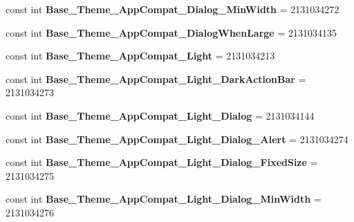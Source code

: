 \begin{DoxyCompactItemize}
\item 
\hypertarget{classClient_1_1Droid_1_1Resource_1_1Style_ab2fabf965afd5b155819f84733641431}{}const int {\bfseries Base\+\_\+\+Theme\+\_\+\+App\+Compat\+\_\+\+Dialog\+\_\+\+Min\+Width} = 2131034272\label{classClient_1_1Droid_1_1Resource_1_1Style_ab2fabf965afd5b155819f84733641431}

\item 
\hypertarget{classClient_1_1Droid_1_1Resource_1_1Style_a732d53e459b30f355b0a9300afff2002}{}const int {\bfseries Base\+\_\+\+Theme\+\_\+\+App\+Compat\+\_\+\+Dialog\+When\+Large} = 2131034135\label{classClient_1_1Droid_1_1Resource_1_1Style_a732d53e459b30f355b0a9300afff2002}

\item 
\hypertarget{classClient_1_1Droid_1_1Resource_1_1Style_a81e9e79abb9a4833d9c52c37330cea3b}{}const int {\bfseries Base\+\_\+\+Theme\+\_\+\+App\+Compat\+\_\+\+Light} = 2131034213\label{classClient_1_1Droid_1_1Resource_1_1Style_a81e9e79abb9a4833d9c52c37330cea3b}

\item 
\hypertarget{classClient_1_1Droid_1_1Resource_1_1Style_a26b4f1395913234b28d596fc8235762a}{}const int {\bfseries Base\+\_\+\+Theme\+\_\+\+App\+Compat\+\_\+\+Light\+\_\+\+Dark\+Action\+Bar} = 2131034273\label{classClient_1_1Droid_1_1Resource_1_1Style_a26b4f1395913234b28d596fc8235762a}

\item 
\hypertarget{classClient_1_1Droid_1_1Resource_1_1Style_acbba7782e88c3641c06104891c6daea9}{}const int {\bfseries Base\+\_\+\+Theme\+\_\+\+App\+Compat\+\_\+\+Light\+\_\+\+Dialog} = 2131034144\label{classClient_1_1Droid_1_1Resource_1_1Style_acbba7782e88c3641c06104891c6daea9}

\item 
\hypertarget{classClient_1_1Droid_1_1Resource_1_1Style_af48dea6c3dd3dd215a58fc4448a6f304}{}const int {\bfseries Base\+\_\+\+Theme\+\_\+\+App\+Compat\+\_\+\+Light\+\_\+\+Dialog\+\_\+\+Alert} = 2131034274\label{classClient_1_1Droid_1_1Resource_1_1Style_af48dea6c3dd3dd215a58fc4448a6f304}

\item 
\hypertarget{classClient_1_1Droid_1_1Resource_1_1Style_a59807d634b7d1de1d700d3b8f777d8c6}{}const int {\bfseries Base\+\_\+\+Theme\+\_\+\+App\+Compat\+\_\+\+Light\+\_\+\+Dialog\+\_\+\+Fixed\+Size} = 2131034275\label{classClient_1_1Droid_1_1Resource_1_1Style_a59807d634b7d1de1d700d3b8f777d8c6}

\item 
\hypertarget{classClient_1_1Droid_1_1Resource_1_1Style_ad7d25e7c89608698d55b989420a9bc12}{}const int {\bfseries Base\+\_\+\+Theme\+\_\+\+App\+Compat\+\_\+\+Light\+\_\+\+Dialog\+\_\+\+Min\+Width} = 2131034276\label{classClient_1_1Droid_1_1Resource_1_1Style_ad7d25e7c89608698d55b989420a9bc12}


\end{DoxyCompactItemize}
